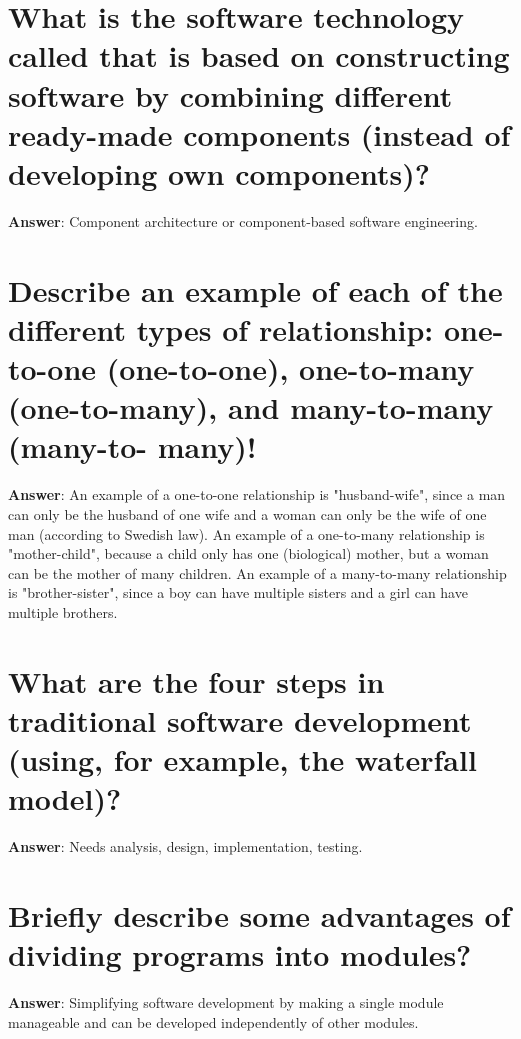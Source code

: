 \documentclass[a4paper,11pt,oneside]{book}
\begin{document}
\begin{sloppypar}
\section{What is the software technology called that is based on constructing software by combining different ready-made components (instead of developing own components)?}

\label{q:231:sa:en:True}

\textbf{Answer}: Component architecture or component-based software engineering.



\section{Describe an example of each of the different types of relationship: one-to-one (one-to-one), one-to-many (one-to-many), and many-to-many (many-to- many)!}

\label{q:232:sa:en:True}

\textbf{Answer}: An example of a one-to-one relationship is "husband-wife", since a man can only be the husband of one wife and a woman can only be the wife of one man (according to Swedish law). An example of a one-to-many relationship is "mother-child", because a child only has one (biological) mother, but a woman can be the mother of many children. An example of a many-to-many relationship is "brother-sister", since a boy can have multiple sisters and a girl can have multiple brothers.



\section{What are the four steps in traditional software development (using, for example, the waterfall model)?}

\label{q:233:sa:en:True}

\textbf{Answer}: Needs analysis, design, implementation, testing.



\section{Briefly describe some advantages of dividing programs into modules?}

\label{q:234:sa:en:True}

\textbf{Answer}: Simplifying software development by making a single module manageable and can be developed independently of other modules.




\end{sloppypar}
\end{document}
